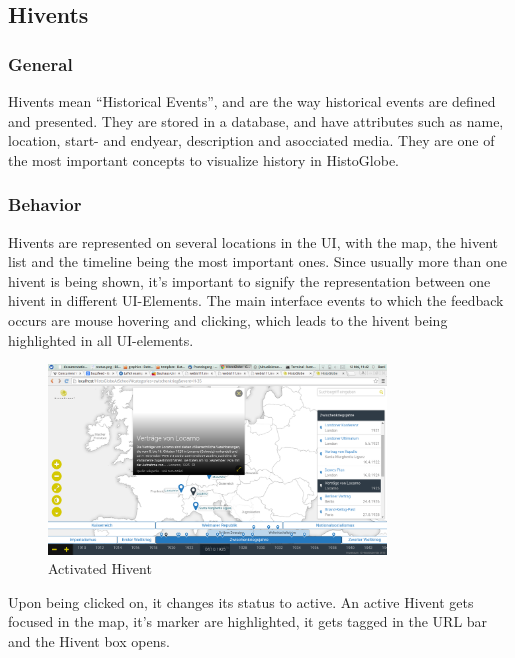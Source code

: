 \subsection{Hivents} %
\label{sec:hivents}
\subsubsection{General} %
\label{sub:general}
Hivents mean ``Historical Events'', and are the way historical events are defined and presented. They are stored in a database, and have attributes such as name, location, start- and endyear, description and asocciated media.
They are one of the most important concepts to visualize history in HistoGlobe.

\subsubsection{Behavior} %
\label{sub:behaviour}
Hivents are represented on several locations in the UI, with the map, the hivent list and the timeline being the most important ones.
Since usually more than one hivent is being shown, it's important to signify the representation between one hivent in different UI-Elements.
The main interface events to which the feedback occurs are mouse hovering and clicking, which leads to the hivent being highlighted in all UI-elements.

  \begin{figure}[here]
\begin{center}
  \includegraphics[width=0.8\textwidth]{graphics/activated_hivent.png}
  \end{center}

  \caption{Activated Hivent}
  \label{fig:activated_hivent}
\end{figure}

Upon being clicked on, it changes its status to active. An active Hivent gets focused in the map, it's marker are highlighted, it gets tagged in the URL bar and the Hivent box opens.

